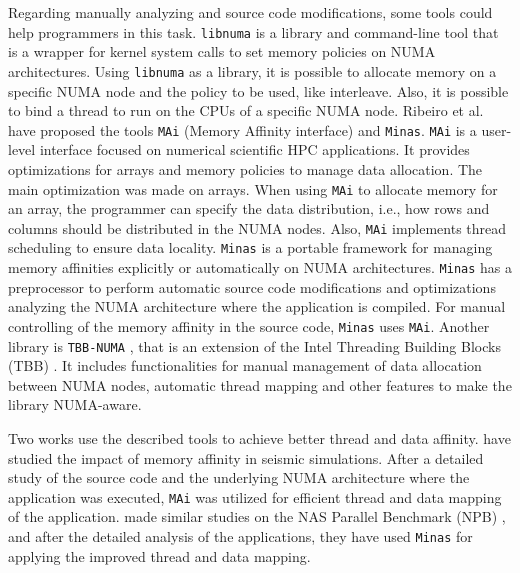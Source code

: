 Regarding manually analyzing and source code modifications, some tools could help programmers in this task. \texttt{libnuma} \cite{libnuma} is a library and command-line tool that is a wrapper for kernel system calls to set memory policies on NUMA architectures. Using \texttt{libnuma} as a library, it is possible to allocate memory on a specific NUMA node and the policy to be used, like interleave. Also, it is possible to bind a thread to run on the CPUs of a specific NUMA node. Ribeiro et al. \citeyearpar{Ribeiro:2009,Ribeiro:2011} have proposed the tools \texttt{MAi} (Memory Affinity interface) and \texttt{Minas}. \texttt{MAi} is a user-level interface focused on numerical scientific HPC applications. It provides optimizations for arrays and memory policies to manage data allocation. The main optimization was made on arrays. When using \texttt{MAi} to allocate memory for an array, the programmer can specify the data distribution, i.e., how rows and columns should be distributed in the NUMA nodes. Also, \texttt{MAi} implements thread scheduling to ensure data locality. \texttt{Minas} is a portable framework for managing memory affinities explicitly or automatically on NUMA architectures. \texttt{Minas} has a preprocessor to perform automatic source code modifications and optimizations analyzing the NUMA architecture where the application is compiled. For manual controlling of the memory affinity in the source code, \texttt{Minas} uses \texttt{MAi}. Another library is \texttt{TBB-NUMA} \cite{Majo:2015, Majo:2017}, that is an extension of the Intel Threading Building Blocks (TBB) \cite{Reinders:2007}. It includes functionalities for manual management of data allocation between NUMA nodes, automatic thread mapping and other features to make the library NUMA-aware. 

Two works use the described tools to achieve better thread and data affinity.  have studied the impact of memory affinity in seismic simulations. After a detailed study of the source code and the underlying NUMA architecture where the application was executed, \texttt{MAi} was utilized for efficient thread and data mapping of the application.  made similar studies on the NAS Parallel Benchmark (NPB) \cite{NPB:1999}, and after the detailed analysis of the applications, they have used \texttt{Minas} for applying the improved thread and data mapping.

